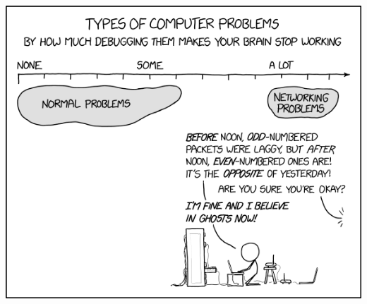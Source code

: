 \documentclass[10pt, landscape]{article}
\begin{document}
\begin{multicols*}{3}
\begin{center}
    \includegraphics[width=0.9\linewidth]{xkcd.png}
\end{center}

\end{multicols*}
\end{document}
